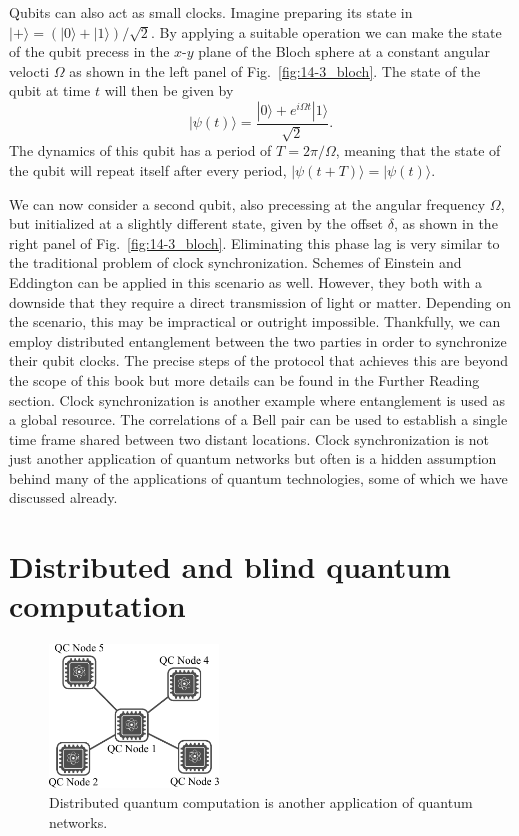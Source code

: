 Qubits can also act as small clocks.
Imagine preparing its state in $|+\rangle = (|0\rangle + |1\rangle) / \sqrt{2}$.
By applying a suitable operation we can make the state of the qubit precess in the $x$-$y$ plane of the Bloch sphere at a constant angular velocti $\Omega$ as shown in the left panel of Fig.~\ref{fig:14-3_bloch}.
The state of the qubit at time $t$ will then be given by
\begin{equation}
    |\psi(t)\rangle = \frac{|0\rangle + e^{i\Omega t} |1\rangle}{\sqrt{2}}.
\end{equation}
The dynamics of this qubit has a period of $T = 2\pi / \Omega$, meaning that the state of the qubit will repeat itself after every period, $|\psi(t+T)\rangle = |\psi(t)\rangle$.

We can now consider a second qubit, also precessing at the angular frequency $\Omega$, but initialized at a slightly different state, given by the offset $\delta$, as shown in the right panel of Fig.~\ref{fig:14-3_bloch}.
Eliminating this phase lag is very similar to the traditional problem of clock synchronization.
Schemes of Einstein and Eddington can be applied in this scenario as well.
However, they both with a downside that they require a direct transmission of light or matter.
Depending on the scenario, this may be impractical or outright impossible.
Thankfully, we can employ distributed entanglement between the two parties in order to synchronize their qubit clocks.
The precise steps of the protocol that achieves this are beyond the scope of this book but more details can be found in the Further Reading section.
Clock synchronization is another example where entanglement is used as a global resource.
The correlations of a Bell pair can be used to establish a single time frame shared between two distant locations.
Clock synchronization is not just another application of quantum networks but often is a hidden assumption behind many of the applications of quantum technologies, some of which we have discussed already.






\section{Distributed and blind quantum computation}
\label{sec:14-4_distributed_bqc}

\begin{figure}[t]
    \centering
    \includegraphics[width=0.4\textwidth]{lesson14/14-4_distributed_qc.pdf}
    \caption[Distributed quantum computation.]{Distributed quantum computation is another application of quantum networks.}
    \label{fig:14-4_distributed_qc}
\end{figure}


